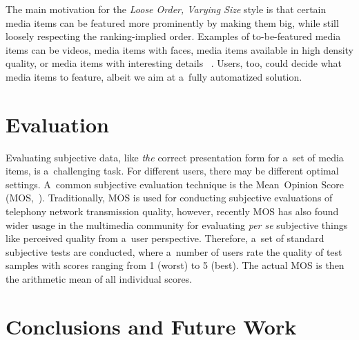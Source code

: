 \documentclass{sig-alternate}
\begin{document}
The main motivation for the \emph{Loose Order, Varying Size} style
is that certain media items can be featured more prominently
by making them big, while still loosely respecting the ranking-implied order.
Examples of to-be-featured media items can be videos,
media items with faces, media items available in high density quality,
or media items with interesting details~%
\cite{suh2003thumbnail}.
Users, too, could decide what media items to feature,
albeit we aim at a~fully automatized solution.

\section{Evaluation}

Evaluating subjective data, like \emph{the} correct presentation form
for a~set of media items, is a~challenging task.
For different users, there may be different optimal settings.
A~common subjective evaluation technique
is the Mean~Opinion Score (MOS,~\cite{itu1998mos}).
Traditionally, MOS is used for conducting subjective evaluations
of telephony network transmission quality,
however, recently MOS has also found
wider usage in the multimedia community
for evaluating \emph{per se} subjective things
like perceived quality from a~user perspective. 
Therefore, a~set of standard subjective tests are conducted,
where a~number of users rate the quality of test samples
with scores ranging from 1 (worst) to 5 (best).
The actual MOS is then the arithmetic mean of all individual scores.

\section{Conclusions and Future Work}



\end{document}
